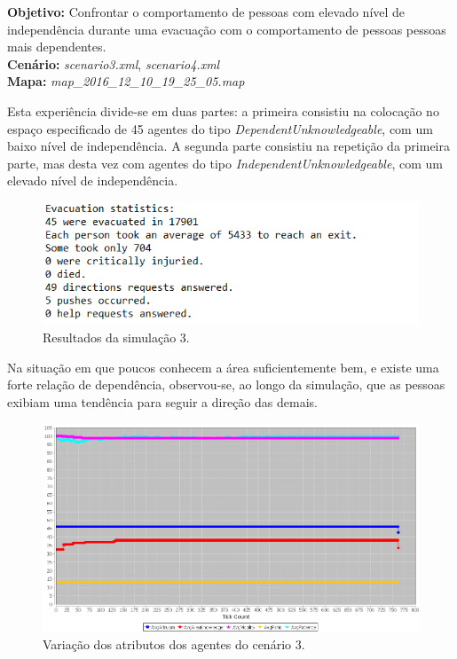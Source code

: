 \documentclass[12pt]{article}
\begin{document}
\begin{titlepage}
\begin{itemize}
\textbf{Objetivo:} 
Confrontar o comportamento de pessoas com elevado nível de independência durante uma evacuação com o comportamento de pessoas pessoas mais dependentes.
\\\textbf{Cenário:} 
\textit{scenario3.xml}, \textit{scenario4.xml}
\\\textbf{Mapa:} 
\textit{map\_2016\_12\_10\_19\_25\_05.map}
\newline


Esta experiência divide-se em duas partes: a primeira consistiu na colocação no espaço especificado de 45 agentes do tipo \textit{DependentUnknowledgeable}, com um baixo nível de independência. A segunda parte consistiu na repetição da primeira parte, mas desta vez com agentes do tipo \textit{IndependentUnknowledgeable}, com um elevado nível de independência.

\begin{figure}[H]
	\centering
	\includegraphics{log_sc_dependent.png}
	\caption{Resultados da simulação 3.}
	\label{log_sc1}
\end{figure}

Na situação em que poucos conhecem a área suficientemente bem, e existe uma forte relação de dependência, observou-se, ao longo da simulação, que as pessoas exibiam uma tendência para seguir a direção das demais. 

\begin{figure}[H]
	\centering
	\includegraphics[scale=.7]{graph_sc_dependent.png}
	\caption{Variação dos atributos dos agentes do cenário 3.}
	\label{graph_sc1}
\end{figure}


\end{itemize}
\end{titlepage}
\end{document}
